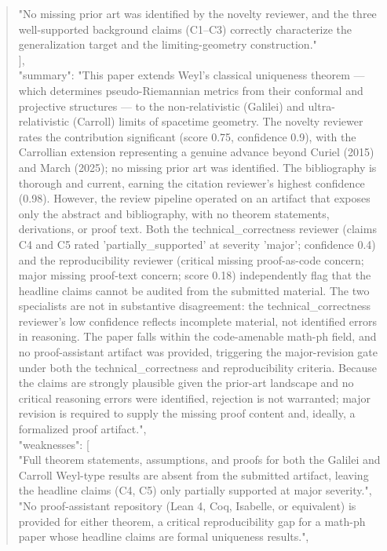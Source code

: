 \documentclass[11pt]{article}
\begin{document}
\begin{quote}
    "No missing prior art was identified by the novelty reviewer, and the three well-supported background claims (C1–C3) correctly characterize the generalization target and the limiting-geometry construction."\\
  ],\\
  "summary": "This paper extends Weyl's classical uniqueness theorem — which determines pseudo-Riemannian metrics from their conformal and projective structures — to the non-relativistic (Galilei) and ultra-relativistic (Carroll) limits of spacetime geometry. The novelty reviewer rates the contribution significant (score 0.75, confidence 0.9), with the Carrollian extension representing a genuine advance beyond Curiel (2015) and March (2025); no missing prior art was identified. The bibliography is thorough and current, earning the citation reviewer's highest confidence (0.98). However, the review pipeline operated on an artifact that exposes only the abstract and bibliography, with no theorem statements, derivations, or proof text. Both the technical\_correctness reviewer (claims C4 and C5 rated 'partially\_supported' at severity 'major'; confidence 0.4) and the reproducibility reviewer (critical missing proof-as-code concern; major missing proof-text concern; score 0.18) independently flag that the headline claims cannot be audited from the submitted material. The two specialists are not in substantive disagreement: the technical\_correctness reviewer's low confidence reflects incomplete material, not identified errors in reasoning. The paper falls within the code-amenable math-ph field, and no proof-assistant artifact was provided, triggering the major-revision gate under both the technical\_correctness and reproducibility criteria. Because the claims are strongly plausible given the prior-art landscape and no critical reasoning errors were identified, rejection is not warranted; major revision is required to supply the missing proof content and, ideally, a formalized proof artifact.",\\
  "weaknesses": [\\
    "Full theorem statements, assumptions, and proofs for both the Galilei and Carroll Weyl-type results are absent from the submitted artifact, leaving the headline claims (C4, C5) only partially supported at major severity.",\\
    "No proof-assistant repository (Lean 4, Coq, Isabelle, or equivalent) is provided for either theorem, a critical reproducibility gap for a math-ph paper whose headline claims are formal uniqueness results.",\\

\end{quote}
\end{document}
